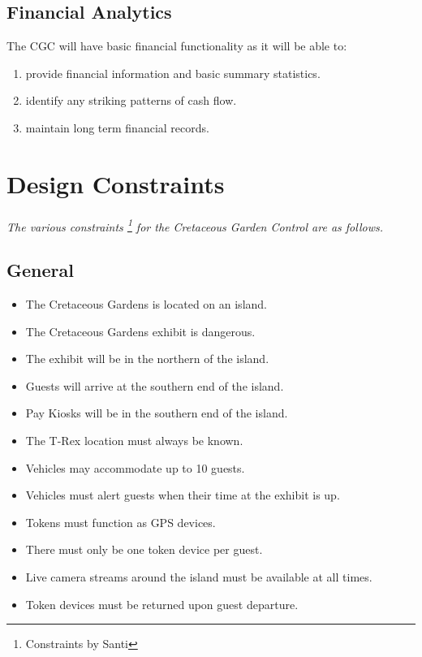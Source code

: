 \documentclass[12pt]{article}
\begin{document}
	\subsection{Financial Analytics} The CGC will have basic financial functionality as it will
	be able to:
	\begin{enumerate}
		\item provide financial information and basic summary statistics.
		\item identify any striking patterns of cash flow.
		\item maintain long term financial records.
	\end{enumerate}

\section{Design Constraints}
\label{con}
\paragraph{} \textit{The various constraints \footnote{Constraints by Santi} for the Cretaceous Garden Control are as follows.}
	\subsection{General}
	\begin{itemize}
		\item The Cretaceous Gardens is located on an island.
		\item The Cretaceous Gardens exhibit is dangerous.
		\item The exhibit will be in the northern of the island.
		\item Guests will arrive at the southern end of the island.
		\item Pay Kiosks will be in the southern end of the island.
		\item The T-Rex location must always be known.
		\item Vehicles may accommodate up to 10 guests.
		\item Vehicles must alert guests when their time at the exhibit is up.
		\item Tokens must function as GPS devices.
		\item There must only be one token device per guest.
		\item Live camera streams around the island must be available at all times.
		\item Token devices must be returned upon guest departure.
	\end{itemize}
	
\end{document}
